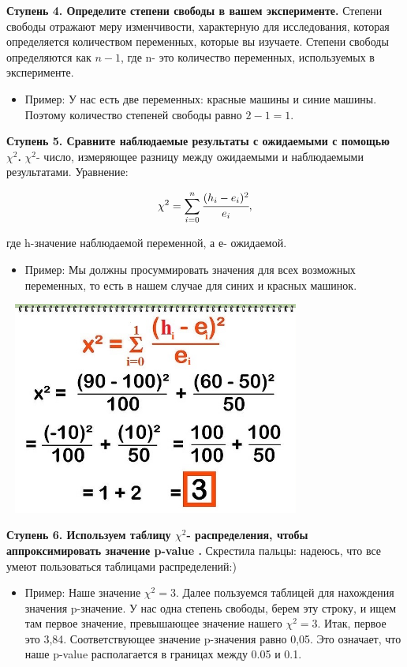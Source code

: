 \documentclass[final,pdftex]{../../template/epsilonj}
\numberwithin{equation}{section}
\begin{document}
\textbf{Ступень 4. Определите степени свободы в вашем эксперименте.} Степени свободы отражают меру изменчивости, характерную для исследования, которая определяется количеством переменных, которые вы изучаете. Степени свободы определяются как $n-1$, где n- это количество переменных, используемых в эксперименте.

\begin{itemize}
	\item Пример: У нас есть две переменных: красные машины и синие машины. Поэтому количество степеней свободы равно $2-1=1$.
\end{itemize}

\textbf{Ступень 5. Сравните наблюдаемые результаты с ожидаемыми с помощью $\chi^2$.} $\chi^2$- число, измеряющее разницу между ожидаемыми и наблюдаемыми результатами. Уравнение: 

$$\chi^2=\sum_{i=0}^{n} \cfrac {(h_i-e_i)^2}{e_i},$$

где h-значение наблюдаемой переменной, а е- ожидаемой.

\begin{itemize}
	\item Пример: Мы должны просуммировать значения для всех возможных переменных, то есть в нашем случае для синих и красных машинок.
\end{itemize}

\includegraphics[width=100mm,height=70mm]{4.jpg}


\textbf{Ступень 6. Используем таблицу $\chi^2$- распределения, чтобы аппроксимировать значение p-value .} Скрестила пальцы: надеюсь, что все умеют пользоваться таблицами распределений:)

\begin{itemize}
	\item Пример: Наше значение $\chi^2=3$. Далее пользуемся таблицей для нахождения значения p-значение. У нас одна степень свободы, берем эту строку, и ищем там первое значение, превышающее значение нашего $\chi^2=3$. Итак, первое это 3,84. Соответствующее значение p-значения равно 0,05. Это означает, что наше p-value располагается в границах между 0.05 и 0.1.
\end{itemize}
\end{document}

